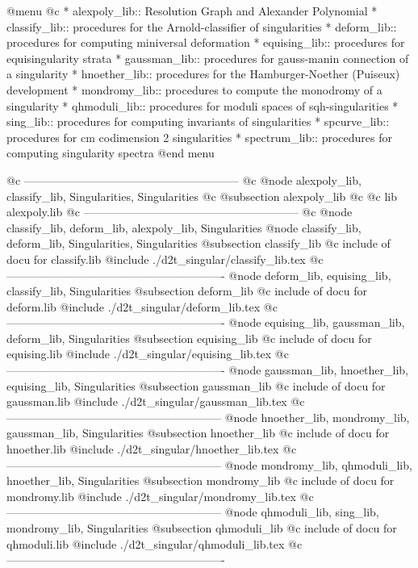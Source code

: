 @menu
@c * alexpoly_lib:: Resolution Graph and Alexander Polynomial
* classify_lib:: procedures for the Arnold-classifier of singularities
* deform_lib:: procedures for computing miniversal deformation
* equising_lib:: procedures for equisingularity strata
* gaussman_lib:: procedures for gauss-manin connection of a singularity
* hnoether_lib:: procedures for the Hamburger-Noether (Puiseux) development
* mondromy_lib:: procedures to compute the monodromy of a singularity
* qhmoduli_lib:: procedures for moduli spaces of sqh-singularities
* sing_lib:: procedures for computing invariants of singularities
* spcurve_lib:: procedures for cm codimension 2 singularities
* spectrum_lib:: procedures for computing singularity spectra
@end menu

@c ---------------------------------------------------------
@c @node alexpoly_lib, classify_lib, Singularities, Singularities
@c @subsection alexpoly_lib
@c @c lib alexpoly.lib
@c ---------------------------------------------------------
@c @node classify_lib, deform_lib, alexpoly_lib, Singularities
@node classify_lib, deform_lib, Singularities, Singularities
@subsection classify_lib
@c include of docu for classify.lib
@include ./d2t_singular/classify_lib.tex
@c ----------------------------------------------------------
@node deform_lib, equising_lib, classify_lib, Singularities
@subsection deform_lib
@c include of docu for deform.lib
@include ./d2t_singular/deform_lib.tex
@c ----------------------------------------------------------
@node equising_lib, gaussman_lib, deform_lib, Singularities
@subsection equising_lib
@c include of docu for equising.lib
@include ./d2t_singular/equising_lib.tex
@c ----------------------------------------------------------
@node gaussman_lib, hnoether_lib, equising_lib, Singularities
@subsection gaussman_lib
@c include of docu for gaussman.lib
@include ./d2t_singular/gaussman_lib.tex
@c ---------------------------------------------------------
@node hnoether_lib, mondromy_lib, gaussman_lib, Singularities
@subsection hnoether_lib
@c include of docu for hnoether.lib
@include ./d2t_singular/hnoether_lib.tex
@c ---------------------------------------------------------
@node mondromy_lib, qhmoduli_lib, hnoether_lib, Singularities
@subsection mondromy_lib
@c include of docu for mondromy.lib
@include ./d2t_singular/mondromy_lib.tex
@c ---------------------------------------------------------
@node qhmoduli_lib, sing_lib, mondromy_lib, Singularities
@subsection qhmoduli_lib
@c include of docu for qhmoduli.lib
@include ./d2t_singular/qhmoduli_lib.tex
@c ----------------------------------------------------------
